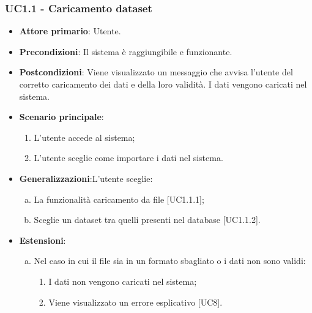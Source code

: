 \subsubsection{UC1.1 - Caricamento dataset}

\begin{itemize}
	\item \textbf{Attore primario}: Utente.
	\item \textbf{Precondizioni}: Il sistema è raggiungibile e funzionante.
	\item \textbf{Postcondizioni}: Viene visualizzato un messaggio che avvisa l'utente del corretto caricamento dei dati e della loro validità. I dati vengono caricati nel sistema.
	\item \textbf{Scenario principale}:
		\begin{enumerate}
			\item L'utente accede al sistema;
			\item L'utente sceglie come importare i dati nel sistema.
			
		\end{enumerate}
		
	\item \textbf{Generalizzazioni}:L'utente sceglie:
	\begin{enumerate}[(a)]
			\item La funzionalità caricamento da file [UC1.1.1];
			\item Sceglie un dataset tra quelli presenti nel database [UC1.1.2].
			\end{enumerate}
	
	\item \textbf{Estensioni}:
	\begin{enumerate}[(a)]
		\item Nel caso in cui il file sia in un formato sbagliato o i dati non sono validi:
		\begin{enumerate}[1.]
			\item I dati non vengono caricati nel sistema;
			\item Viene visualizzato un errore esplicativo [UC8].
		\end{enumerate}
	\end{enumerate}
\end{itemize}


